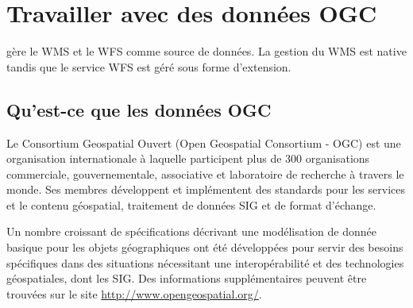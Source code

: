 \chapter{Travailler avec des données OGC}


\qg gère le WMS et le WFS comme source de données. La gestion du WMS est native tandis que le service WFS est géré sous forme d'extension.

\section{Qu'est-ce que les données OGC}

Le Consortium Geospatial Ouvert (Open Geospatial Consortium - OGC) est une organisation internationale à laquelle participent plus de 300 organisations commerciale, gouvernementale, associative et laboratoire de recherche à travers  le monde. Ses membres développent et implémentent des standards pour les services et le contenu géospatial, traitement de données SIG et de format d'échange.


Un nombre croissant de spécifications décrivant une modélisation de donnée basique pour les objets géographiques ont été développées pour servir des besoins spécifiques dans des situations nécessitant une interopérabilité et des technologies géospatiales, dont les SIG. Des informations supplémentaires peuvent être trouvées sur le site
\url{http://www.opengeospatial.org/}.

